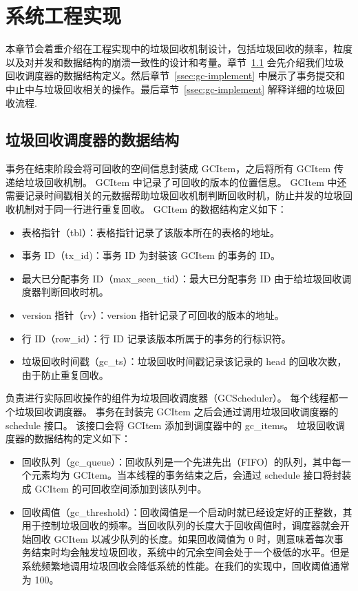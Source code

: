 \section{系统工程实现}
\label{sec:implement}

本章节会着重介绍在工程实现中的垃圾回收机制设计，包括垃圾回收的频率，粒度以及对并发和数据结构的崩溃一致性的设计和考量。章节~\ref{ssec:gc-metadata} 会先介绍我们垃圾回收调度器的数据结构定义。然后章节~\ref{ssec:gc-implement} 中展示了事务提交和中止中与垃圾回收相关的操作。最后章节~\ref{ssec:gc-implement} 解释详细的垃圾回收流程.

\subsection{垃圾回收调度器的数据结构}
\label{ssec:gc-metadata}


事务在结束阶段会将可回收的空间信息封装成 GCItem，之后将所有 GCItem 传递给垃圾回收机制。
GCItem 中记录了可回收的版本的位置信息。
GCItem 中还需要记录时间戳相关的元数据帮助垃圾回收机制判断回收时机，防止并发的垃圾回收机制对于同一行进行重复回收。
GCItem 的数据结构定义如下：
\begin{itemize}
    \item 表格指针（tbl）：表格指针记录了该版本所在的表格的地址。
    \item 事务 ID（tx\_id)：事务 ID 为封装该 GCItem 的事务的 ID。
    \item 最大已分配事务 ID（max\_seen\_tid）：最大已分配事务 ID 由于给垃圾回收调度器判断回收时机。
    \item version 指针（rv）：version 指针记录了可回收的版本的地址。
    \item 行 ID（row\_id）：行 ID 记录该版本所属于的事务的行标识符。
    \item 垃圾回收时间戳（gc\_ts）：垃圾回收时间戳记录该记录的 head 的回收次数，由于防止重复回收。
\end{itemize}

负责进行实际回收操作的组件为垃圾回收调度器（GCScheduler）。
每个线程都一个垃圾回收调度器。
事务在封装完 GCItem 之后会通过调用垃圾回收调度器的 schedule 接口。
该接口会将 GCItem 添加到调度器中的 gc\_items。
垃圾回收调度器的数据结构的定义如下：
\begin{itemize}
    \item 回收队列（gc\_queue）：回收队列是一个先进先出（FIFO）的队列，其中每一个元素均为 GCItem。当本线程的事务结束之后，会通过 schedule 接口将封装成 GCItem 的可回收空间添加到该队列中。
    \item 回收阈值（gc\_threshold）：回收阈值是一个启动时就已经设定好的正整数，其用于控制垃圾回收的频率。当回收队列的长度大于回收阈值时，调度器就会开始回收 GCItem 以减少队列的长度。如果回收阈值为 0 时，则意味着每次事务结束时均会触发垃圾回收，系统中的冗余空间会处于一个极低的水平。但是系统频繁地调用垃圾回收会降低系统的性能。在我们的实现中，回收阈值通常为 100。
\end{itemize}



